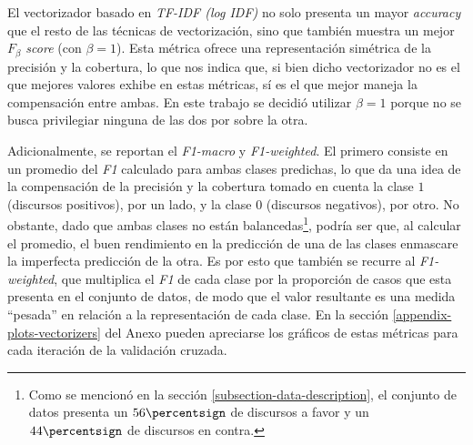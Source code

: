 El vectorizador basado en \textit{TF-IDF (log IDF)} no solo presenta un mayor
\textit{accuracy} que el resto de las t\'ecnicas de vectorizaci\'on, sino que
tambi\'en muestra un mejor \textit{$F_{\beta}$ score} (con $\beta=1$).
Esta m\'etrica ofrece una representaci\'on sim\'etrica de la precisi\'on y la cobertura,
lo que nos indica que, si bien dicho vectorizador no es el que mejores valores
exhibe en estas m\'etricas, s\'i es el que mejor maneja la compensaci\'on
entre ambas. En este trabajo se decidi\'o utilizar $\beta=1$ porque no se busca
privilegiar ninguna de las dos por sobre la otra.
\par
Adicionalmente, se reportan el \textit{F1-macro} y \textit{F1-weighted}.
El primero consiste en un promedio del \textit{F1} calculado para ambas clases
predichas, lo que da una idea de la compensaci\'on de la precisi\'on y la
cobertura tomado en cuenta la clase $1$ (discursos positivos), por un lado, y
la clase $0$ (discursos negativos), por otro. No obstante, dado que ambas clases no
est\'an balancedas\footnote{Como se mencion\'o en la secci\'on
\ref{subsection-data-description}, el conjunto de datos presenta un $56\percentsign$
de discursos a favor y un $44\percentsign$ de discursos en contra.}, podr\'ia ser que,
al calcular el promedio, el buen rendimiento en la predicci\'on de una de las clases
enmascare la imperfecta predicci\'on de la otra. Es por esto
que tambi\'en se recurre al \textit{F1-weighted}, que multiplica el \textit{F1}
de cada clase por la proporci\'on de casos que esta presenta en el conjunto de datos,
de modo que el valor resultante es una medida ``pesada'' en relaci\'on a la representaci\'on
de cada clase. En la secci\'on \ref{appendix-plots-vectorizers} del Anexo pueden
apreciarse los gr\'aficos de estas m\'etricas para cada iteraci\'on de la validaci\'on
cruzada.
